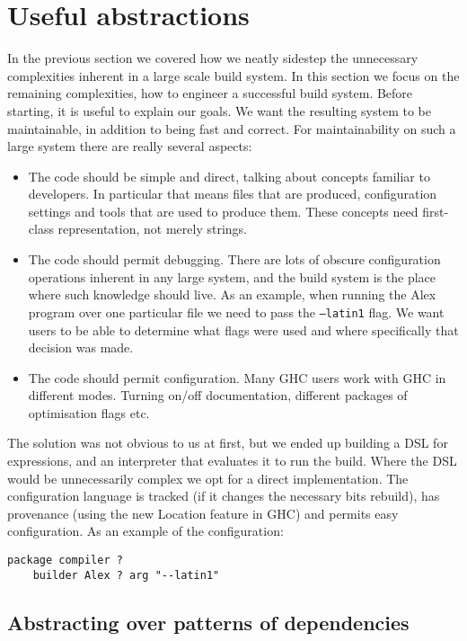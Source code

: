 \section{Useful abstractions\label{sec:abstractions}}

In the previous section we covered how we neatly sidestep the unnecessary complexities inherent in a large scale build system. In this section we focus on the remaining complexities, how to engineer a successful build system. Before starting, it is useful to explain our goals. We want the resulting system to be maintainable, in addition to being fast and correct. For maintainability on such a large system there are really several aspects:

\begin{itemize}
\item The code should be simple and direct, talking about concepts familiar to developers. In particular that means files that are produced, configuration settings and tools that are used to produce them. These concepts need first-class representation, not merely strings.
\item The code should permit debugging. There are lots of obscure configuration operations inherent in any large system, and the build system is the place where such knowledge should live. As an example, when running the Alex program over one particular file we need to pass the \texttt{--latin1} flag. We want users to be able to determine what flags were used and where specifically that decision was made.
\item The code should permit configuration. Many GHC users work with GHC in different modes. Turning on/off documentation, different packages of optimisation flags etc.
\end{itemize}

The solution was not obvious to us at first, but we ended up building a DSL for expressions, and an interpreter that evaluates it to run the build. Where the DSL would be unnecessarily complex we opt for a direct implementation. The configuration language is tracked (if it changes the necessary bits rebuild), has provenance (using the new Location feature in GHC) and permits easy configuration. As an example of the configuration:

\begin{verbatim}
package compiler ?
    builder Alex ? arg "--latin1"
\end{verbatim}



\subsection{Abstracting over patterns of dependencies}


